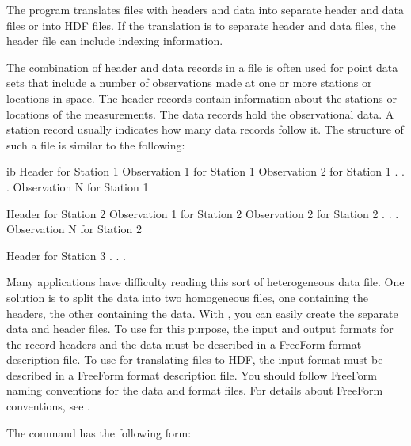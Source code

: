 The  program translates files with headers and data into
separate header and data files or into HDF files. If the translation
is to separate header and data files, the header file can include
indexing information.

The combination of header and data records in a file is often used for
point data sets that include a number of observations made at one or
more stations or locations in space. The header records contain
information about the stations or locations of the measurements. The
data records hold the observational data. A station record usually
indicates how many data records follow it. The structure of such a
file is similar to the following:

\begin{vcode}{ib}
Header for Station 1
Observation 1 for Station 1
Observation 2 for Station 1
       .
       .
       .
Observation N for Station 1

Header for Station 2
Observation 1 for Station 2
Observation 2 for Station 2
       .
       .
       .
Observation N for Station 2

Header for Station 3
       .
       .
       . 
\end{vcode}

Many applications have difficulty reading this sort of heterogeneous
data file. One solution is to split the data into two homogeneous
files, one containing the headers, the other containing the data. With
, you can easily create the separate data and header
files. To use  for this purpose, the input and output
formats for the record headers and the data must be described in a
FreeForm format description file. To use  for
translating files to HDF, the input format must be described in a
FreeForm format description file. You should follow FreeForm naming
conventions for the data and format files. For details about FreeForm
conventions, see .

The  command has the following form:   


